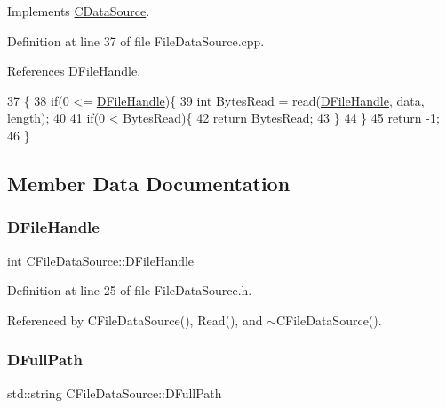 Implements \hyperlink{classCDataSource_ad94adc5076f973dcce83b73395eec86b}{C\+Data\+Source}.



Definition at line 37 of file File\+Data\+Source.\+cpp.



References D\+File\+Handle.


\begin{DoxyCode}
37                                                \{
38     \textcolor{keywordflow}{if}(0 <= \hyperlink{classCFileDataSource_abad036de6dfe018ddc6160a2026a401d}{DFileHandle})\{
39         \textcolor{keywordtype}{int} BytesRead = read(\hyperlink{classCFileDataSource_abad036de6dfe018ddc6160a2026a401d}{DFileHandle}, data, length);
40         
41         \textcolor{keywordflow}{if}(0 < BytesRead)\{
42             \textcolor{keywordflow}{return} BytesRead;   
43         \}
44     \}
45     \textcolor{keywordflow}{return} -1;
46 \}
\end{DoxyCode}


\subsection{Member Data Documentation}
\hypertarget{classCFileDataSource_abad036de6dfe018ddc6160a2026a401d}{}\label{classCFileDataSource_abad036de6dfe018ddc6160a2026a401d} 
\subsubsection{\texorpdfstring{D\+File\+Handle}{DFileHandle}}
{\footnotesize\ttfamily int C\+File\+Data\+Source\+::\+D\+File\+Handle\hspace{0.3cm}{\ttfamily [protected]}}



Definition at line 25 of file File\+Data\+Source.\+h.



Referenced by C\+File\+Data\+Source(), Read(), and $\sim$\+C\+File\+Data\+Source().

\hypertarget{classCFileDataSource_acf4e0d3f7c32cae09f91b7530e490aea}{}\label{classCFileDataSource_acf4e0d3f7c32cae09f91b7530e490aea} 
\subsubsection{\texorpdfstring{D\+Full\+Path}{DFullPath}}
{\footnotesize\ttfamily std\+::string C\+File\+Data\+Source\+::\+D\+Full\+Path\hspace{0.3cm}{\ttfamily [protected]}}



